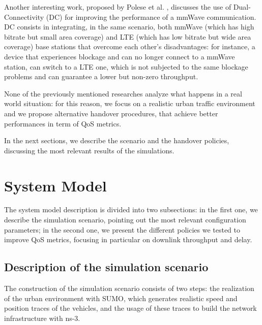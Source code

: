 \documentclass[conference,10pt]{IEEEtran}
\begin{document}
Another interesting work, proposed by Polese et al. \cite{imphand}, discusses the use of Dual-Connectivity (DC) for improving the performance of a mmWave communication. DC consists in integrating, in the same scenario, both mmWave (which has high bitrate but small area coverage) and LTE (which has low bitrate but wide area coverage) base stations that overcome each other's disadvantages: for instance, a device that experiences blockage and can no longer connect to a mmWave station, can switch to a LTE one, which is not subjected to the same blockage problems and can guarantee a lower but non-zero throughput.

None of the previously mentioned researches analyze what happens in a real world situation: for this reason, we focus on a realistic urban traffic environment and we propose alternative handover procedures, that achieve better performances in term of QoS metrics.

In the next sections, we describe the scenario and the handover policies, discussing the most relevant results of the simulations.


\section{System Model}\label{sec:symo}
The system model description is divided into two subsections: in the first one, we describe the simulation scenario, pointing out the most relevant configuration parameters; in the second one, we present the different policies we tested to improve QoS metrics, focusing in particular on downlink throughput and delay.


\subsection{Description of the simulation scenario}

The construction of the simulation scenario consists of two steps: the realization of the urban environment with SUMO, which generates realistic speed and position traces of the vehicles, and the usage of these traces to build the network infrastructure with ns-3.
\end{document}
